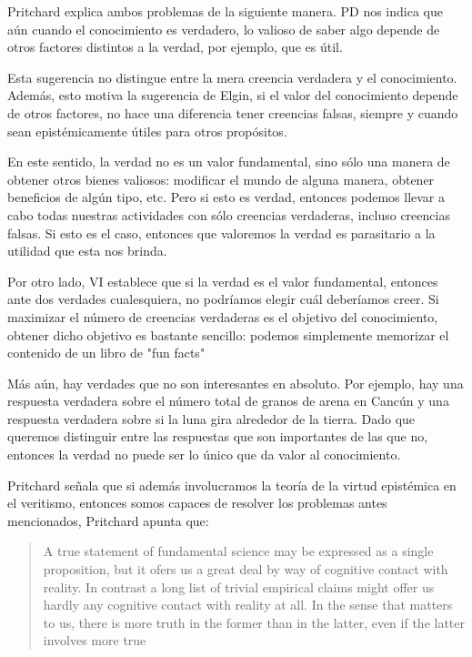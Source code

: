 {{{Pritchard explica ambos problemas de la siguiente manera.
PD nos indica que aún cuando el conocimiento es verdadero, lo valioso de saber algo depende de otros factores distintos a la verdad, por ejemplo, que es útil.

Esta sugerencia no distingue entre la mera creencia verdadera y el conocimiento.
Además, esto motiva la sugerencia de Elgin, si el valor del conocimiento depende de otros factores, no hace una diferencia tener creencias falsas, siempre y cuando sean epistémicamente útiles para otros propósitos.

En este sentido, la verdad no es un valor fundamental, sino sólo una manera de obtener otros bienes valiosos: modificar el mundo de alguna manera, obtener beneficios de algún tipo, etc.
Pero si esto es verdad, entonces podemos llevar a cabo todas nuestras actividades con sólo creencias verdaderas, incluso creencias falsas. Si esto es el caso, entonces que valoremos la verdad es parasitario a la utilidad que esta nos brinda.

Por otro lado, VI establece que si la verdad es el valor fundamental, entonces ante dos verdades cualesquiera, no podríamos elegir cuál deberíamos creer.
Si maximizar el número de creencias verdaderas es el objetivo del conocimiento, obtener dicho objetivo es bastante sencillo: podemos simplemente memorizar el contenido de un libro de "fun facts"

Más aún, hay verdades que no son interesantes en absoluto.
Por ejemplo, hay una respuesta verdadera sobre el número total de granos de arena en Cancún y una respuesta verdadera sobre si la luna gira alrededor de la tierra.
Dado que queremos distinguir entre las respuestas que son importantes de las que no, entonces la verdad no puede ser lo único que da valor al conocimiento.

Pritchard señala que si además involucramos la teoría de la virtud epistémica en el veritismo, entonces somos capaces de resolver los problemas antes mencionados, Pritchard apunta que:

\begin{quote}
  A true statement of fundamental science may be expressed as a single proposition, but it ofers us a great deal by way of cognitive contact with reality. In contrast a long list of trivial empirical claims might offer us hardly any cognitive contact with reality at all. In the sense that matters to us, there is more truth in the former than in the latter, even if the latter involves more true %
\end{quote}

}}}
